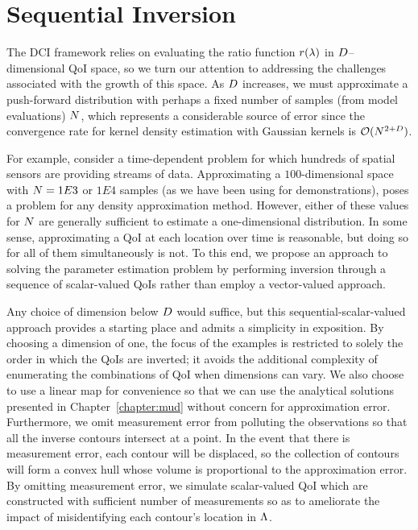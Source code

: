 \section{Sequential Inversion}\label{sec:sequential}
The DCI framework relies on evaluating the ratio function $r(\lambda)$ in $D$--dimensional QoI space, so we turn our attention to addressing the challenges associated with the growth of this space.
As $D$ increases, we must approximate a push-forward distribution with perhaps a fixed number of samples (from model evaluations) $N$, which represents a considerable source of error since the convergence rate for kernel density estimation with Gaussian kernels is $\mathcal{O} (N^{2+D})$.

For example, consider a time-dependent problem for which hundreds of spatial sensors are providing streams of data.
Approximating a $100$-dimensional space with $N = 1E3$ or $1E4$ samples (as we have been using for demonstrations), poses a problem for any density approximation method.
However, either of these values for $N$ are generally sufficient to estimate a one-dimensional distribution.
In some sense, approximating a QoI at each location over time is reasonable, but doing so for all of them simultaneously is not.
To this end, we propose an approach to solving the parameter estimation problem by performing inversion through a sequence of scalar-valued QoIs rather than employ a vector-valued approach.

Any choice of dimension below $D$ would suffice, but this sequential-scalar-valued approach provides a starting place and admits a simplicity in exposition.
By choosing a dimension of one, the focus of the examples is restricted to solely the order in which the QoIs are inverted; it avoids the additional complexity of enumerating the combinations of QoI when dimensions can vary.
We also choose to use a linear map for convenience so that we can use the analytical solutions presented in Chapter~\ref{chapter:mud} without concern for approximation error.
Furthermore, we omit measurement error from polluting the observations so that all the inverse contours intersect at a point.
In the event that there is measurement error, each contour will be displaced, so the collection of contours will form a convex hull whose volume is proportional to the approximation error.
By omitting measurement error, we simulate scalar-valued QoI which are constructed with sufficient number of measurements so as to ameliorate the impact of misidentifying each contour's location in ${\Lambda}$.

